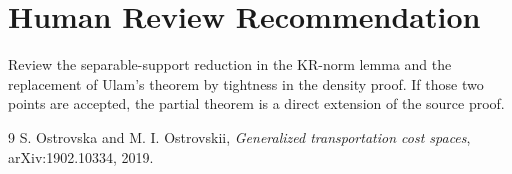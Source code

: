 \documentclass[11pt]{article}
\begin{document}
\section*{Human Review Recommendation}

Review the separable-support reduction in the KR-norm lemma and the replacement
of Ulam's theorem by tightness in the density proof. If those two points are
accepted, the partial theorem is a direct extension of the source proof.

\begin{thebibliography}{9}
S. Ostrovska and M. I. Ostrovskii,
\emph{Generalized transportation cost spaces}, arXiv:1902.10334, 2019.
\end{thebibliography}
\end{document}
